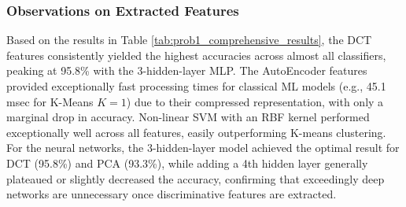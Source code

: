 \subsubsection{Observations on Extracted Features}
Based on the results in Table \ref{tab:prob1_comprehensive_results}, the DCT features consistently yielded the highest accuracies across almost all classifiers, peaking at 95.8\% with the 3-hidden-layer MLP. The AutoEncoder features provided exceptionally fast processing times for classical ML models (e.g., 45.1 msec for K-Means $K=1$) due to their compressed representation, with only a marginal drop in accuracy. Non-linear SVM with an RBF kernel performed exceptionally well across all features, easily outperforming K-means clustering. For the neural networks, the 3-hidden-layer model achieved the optimal result for DCT (95.8\%) and PCA (93.3\%), while adding a 4th hidden layer generally plateaued or slightly decreased the accuracy, confirming that exceedingly deep networks are unnecessary once discriminative features are extracted.
